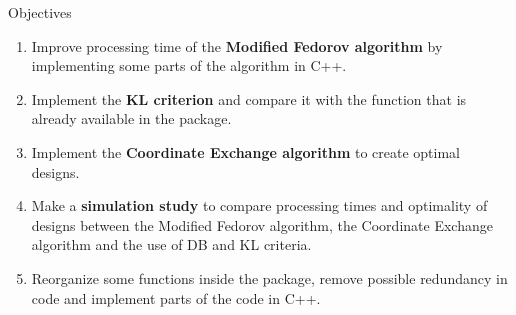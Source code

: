 \documentclass[11pt,t]{beamer}
\begin{document}
\begin{frame}[fragile]{Objectives}
	\begin{enumerate}
		\item Improve processing time of the \textbf{Modified Fedorov algorithm} by implementing some parts of the algorithm in C++. \textcolor{red}{\checkmark} %
		\item Implement the \textbf{KL criterion} and compare it with the function that is already available in the package. \textcolor{red}{\checkmark} %
		\item Implement the \textbf{Coordinate Exchange algorithm} to create optimal designs. %
		\item Make a \textbf{simulation study} to compare processing times and optimality of designs between the Modified Fedorov algorithm, the Coordinate Exchange algorithm and the use of DB and KL criteria. %
		\item Reorganize some functions inside the package, remove possible redundancy in code and implement parts of the code in C++. \textcolor{red}{\checkmark}
	\end{enumerate}
\end{frame}

\begin{frame}

\centering
\end{frame}

%
%
%
\end{document}
